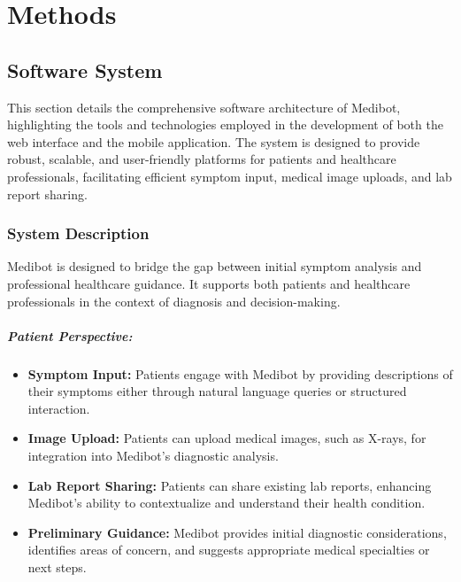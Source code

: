 
\chapter{Methods}

\section{Software System}

This section details the comprehensive software architecture of Medibot, highlighting the tools and technologies employed in the development of both the web interface and the mobile application. The system is designed to provide robust, scalable, and user-friendly platforms for patients and healthcare professionals, facilitating efficient symptom input, medical image uploads, and lab report sharing. 

\subsection{System Description}
Medibot is designed to bridge the gap between initial symptom analysis and professional healthcare guidance. It supports both patients and healthcare professionals in the context of diagnosis and decision-making.


\paragraph{Patient Perspective:}
\begin{itemize}
    \item \textbf{Symptom Input:} Patients engage with Medibot by providing descriptions of their symptoms either through natural language queries or structured interaction.
    \item \textbf{Image Upload:} Patients can upload medical images, such as X-rays, for integration into Medibot's diagnostic analysis.
    \item \textbf{Lab Report Sharing:} Patients can share existing lab reports, enhancing Medibot’s ability to contextualize and understand their health condition.
    \item \textbf{Preliminary Guidance:} Medibot provides initial diagnostic considerations, identifies areas of concern, and suggests appropriate medical specialties or next steps.
\end{itemize}

